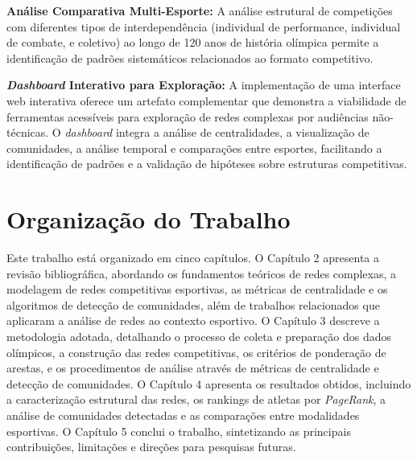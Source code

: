 \textbf{Análise Comparativa Multi-Esporte:} A análise estrutural de competições com diferentes tipos de interdependência (individual de performance, individual de combate, e coletivo) ao longo de 120 anos de história olímpica permite a identificação de padrões sistemáticos relacionados ao formato competitivo.

\textbf{\textit{Dashboard} Interativo para Exploração:} A implementação de uma interface web interativa oferece um artefato complementar que demonstra a viabilidade de ferramentas acessíveis para exploração de redes complexas por audiências não-técnicas. O \textit{dashboard} integra a análise de centralidades, a visualização de comunidades, a análise temporal e comparações entre esportes, facilitando a identificação de padrões e a validação de hipóteses sobre estruturas competitivas.

\section{Organização do Trabalho}

Este trabalho está organizado em cinco capítulos. O Capítulo 2 apresenta a revisão bibliográfica, abordando os fundamentos teóricos de redes complexas, a modelagem de redes competitivas esportivas, as métricas de centralidade e os algoritmos de detecção de comunidades, além de trabalhos relacionados que aplicaram a análise de redes ao contexto esportivo. O Capítulo 3 descreve a metodologia adotada, detalhando o processo de coleta e preparação dos dados olímpicos, a construção das redes competitivas, os critérios de ponderação de arestas, e os procedimentos de análise através de métricas de centralidade e detecção de comunidades. O Capítulo 4 apresenta os resultados obtidos, incluindo a caracterização estrutural das redes, os rankings de atletas por \textit{PageRank}{}, a análise de comunidades detectadas e as comparações entre modalidades esportivas. O Capítulo 5 conclui o trabalho, sintetizando as principais contribuições, limitações e direções para pesquisas futuras.